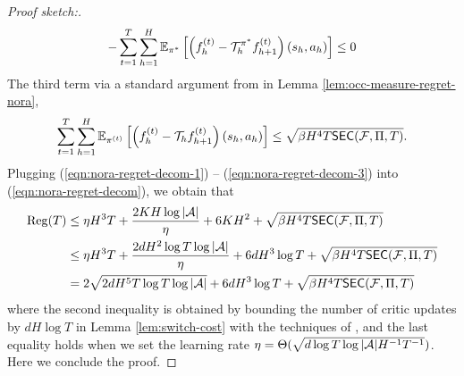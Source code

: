 \begin{proof}[Proof sketch:]
  \begin{align}\label{eqn:nora-regret-decom-2}
   -\sum_{t=1}^T \sum_{h=1}^H\mathbb{E}_{\pi^*}\left[\left(f_h^{(t)}-{\mathcal{T}}_h^{\pi^{*}}f_{h+1}^{(t)}\right)\left(s_h, a_h\right)\right]\leq 0
  \end{align}
  The third term via a standard argument from \citet{xie2022role} in Lemma \ref{lem:occ-measure-regret-nora},
  \begin{align}\label{eqn:nora-regret-decom-3}
      \sum_{t=1}^T \sum_{h=1}^H\mathbb{E}_{\pi^{(t)}}\left[\left(f_h^{(t)}-{\mathcal{T}}_h f_{h+1}^{(t)}\right)\left(s_h, a_h\right)\right] \leq \sqrt{\beta H^4 T\mathsf{SEC}({\mathcal{F}}, \Pi, T)}.
  \end{align}
Plugging (\ref{eqn:nora-regret-decom-1}) -- (\ref{eqn:nora-regret-decom-3}) into (\ref{eqn:nora-regret-decom}), we obtain that
\begin{align}
    \mathrm{Reg}(T) &\leq \eta H^3 T + \frac{2KH\log|{\mathcal{A}}|}{\eta} + 6KH^2 + \sqrt{\beta H^4 T\mathsf{SEC}({\mathcal{F}}, \Pi, T)} \nonumber\\
    & \leq \eta H^3 T +  \frac{2dH^2\log T\log|{\mathcal{A}}|}{\eta} + 6dH^3\log T +  \sqrt{\beta H^4 T\mathsf{SEC}({\mathcal{F}}, \Pi, T)}\nonumber\\
    & = 2\sqrt{2dH^5T\log T\log|{\mathcal{A}}|} +6dH^3\log T +  \sqrt{\beta H^4 T\mathsf{SEC}({\mathcal{F}}, \Pi, T)}
\end{align}
 where the second inequality is obtained by bounding the number of critic updates by $dH\log T$ in Lemma \ref{lem:switch-cost} with the techniques of \citet{xiong2023generalframeworksequentialdecisionmaking}, and the last equality holds when we set the learning rate $\eta = \Theta(\sqrt{d\log T \log |{\mathcal{A}}| H^{-1}T^{-1}})$. Here we conclude the proof.
\end{proof}


